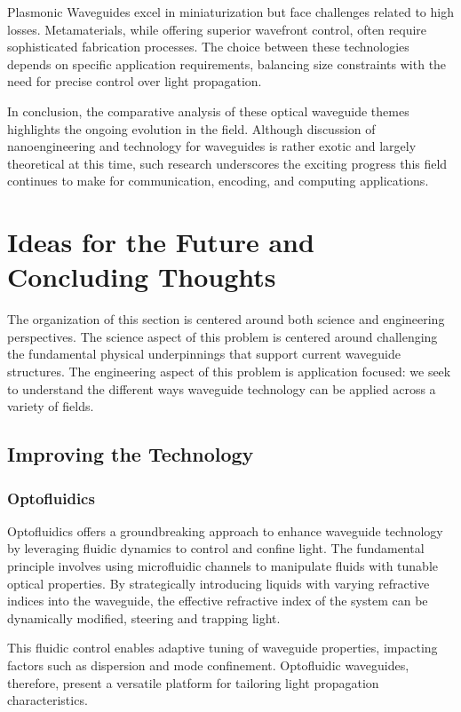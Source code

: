 \documentclass[10pt]{article}
\begin{document}
Plasmonic Waveguides excel in miniaturization but face challenges related to high losses. Metamaterials, while offering superior wavefront control, often require sophisticated fabrication processes. The choice between these technologies depends on specific application requirements, balancing size constraints with the need for precise control over light propagation.

In conclusion, the comparative analysis of these optical waveguide themes highlights the ongoing evolution in the field.
Although discussion of nanoengineering and technology for waveguides is rather exotic and largely theoretical at this time, 
such research underscores the exciting progress this field continues to make for communication, encoding, and computing applications.

\section{Ideas for the Future and Concluding Thoughts}


The organization of this section is centered around both science and engineering perspectives.
The science aspect of this problem is centered around challenging the fundamental physical underpinnings that support
current waveguide structures. The engineering aspect of this problem is application focused: we seek to understand the
different ways waveguide technology can be applied across a variety of fields.




\subsection{Improving the Technology}


\subsubsection{Optofluidics}
Optofluidics offers a groundbreaking approach to enhance waveguide technology by leveraging fluidic dynamics to control and confine light.
The fundamental principle involves using microfluidic channels to manipulate fluids with tunable optical properties.
By strategically introducing liquids with varying refractive indices into the waveguide,
the effective refractive index of the system can be dynamically modified, steering and trapping light.


This fluidic control enables adaptive tuning of waveguide properties,
impacting factors such as dispersion and mode confinement. Optofluidic waveguides,
therefore, present a versatile platform for tailoring light propagation characteristics.
\end{document}
